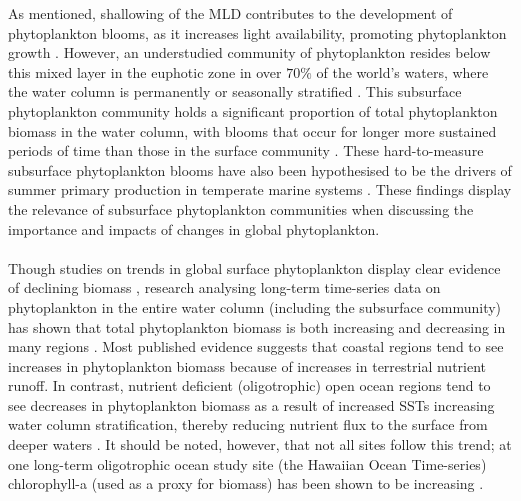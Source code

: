\documentclass{article}
\begin{document}
As mentioned, shallowing of the MLD contributes to the development of phytoplankton blooms, as it increases light availability, promoting phytoplankton growth \citep{townsend_causes_1994,gittings_impacts_2018}. However, an understudied community of phytoplankton resides below this mixed layer in the euphotic zone in over $70\%$ of the world’s waters, where the water column is permanently or seasonally stratified \citep{cullen_subsurface_2015,cullen_deep_1982}. This subsurface phytoplankton community holds a significant proportion of total phytoplankton biomass in the water column, with blooms that occur for longer more sustained periods of time than those in the surface community \citep{ross_blooms_2017}. These hard-to-measure subsurface phytoplankton blooms have also been hypothesised to be the drivers of summer primary production in temperate marine systems \citep{richardson_subsurface_2000}. These findings display the relevance of subsurface phytoplankton communities when discussing the importance and impacts of changes in global phytoplankton. \\ \\
\noindent
Though studies on trends in global surface phytoplankton display clear evidence of declining biomass \citep{boyce_global_2010}, research analysing long-term time-series data on phytoplankton in the entire water column (including the subsurface community) has shown that total phytoplankton biomass is both increasing and decreasing in many regions \citep{boyce_dg_patterns_2015}. Most published evidence suggests that coastal regions tend to see increases in phytoplankton biomass because of increases in terrestrial nutrient runoff. In contrast, nutrient deficient (oligotrophic) open ocean regions tend to see decreases in phytoplankton biomass as a result of increased SSTs increasing water column stratification, thereby reducing nutrient flux to the surface from deeper waters \citep{boyce_dg_patterns_2015,dalelio_machine_2020,schmittner_decline_2005}. It should be noted, however, that not all sites follow this trend; at one long-term oligotrophic ocean study site (the Hawaiian Ocean Time-series) chlorophyll-a (used as a proxy for biomass) has been shown to be increasing \citep{saba_challenges_2010}.\\ \\
\noindent
\end{document}

